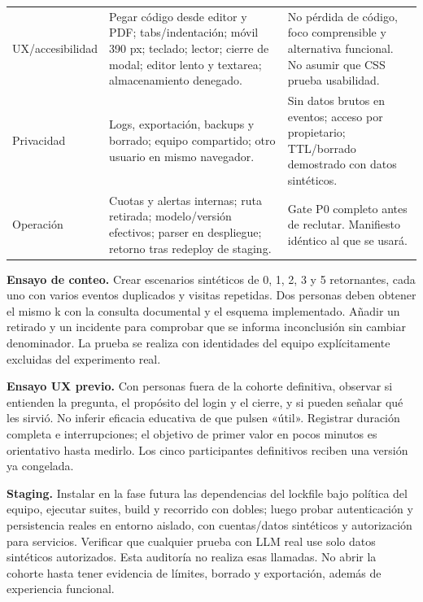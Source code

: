 \documentclass[11pt,a4paper]{report}
\begin{document}
\begin{longtable}{P{2.4cm}P{8cm}P{5.5cm}}
UX/accesibilidad & Pegar código desde editor y PDF; tabs/indentación; móvil 390 px; teclado; lector; cierre de modal; editor lento y textarea; almacenamiento denegado. & No pérdida de código, foco comprensible y alternativa funcional. No asumir que CSS prueba usabilidad.\\
Privacidad & Logs, exportación, backups y borrado; equipo compartido; otro usuario en mismo navegador. & Sin datos brutos en eventos; acceso por propietario; TTL/borrado demostrado con datos sintéticos.\\
Operación & Cuotas y alertas internas; ruta retirada; modelo/versión efectivos; parser en despliegue; retorno tras redeploy de staging. & Gate P0 completo antes de reclutar. Manifiesto idéntico al que se usará.\\\bottomrule
\end{longtable}

\textbf{Ensayo de conteo.} Crear escenarios sintéticos de 0, 1, 2, 3 y 5 retornantes, cada uno con varios eventos duplicados y visitas repetidas. Dos personas deben obtener el mismo k con la consulta documental y el esquema implementado. Añadir un retirado y un incidente para comprobar que se informa inconclusión sin cambiar denominador. La prueba se realiza con identidades del equipo explícitamente excluidas del experimento real.

\textbf{Ensayo UX previo.} Con personas fuera de la cohorte definitiva, observar si entienden la pregunta, el propósito del login y el cierre, y si pueden señalar qué les sirvió. No inferir eficacia educativa de que pulsen «útil». Registrar duración completa e interrupciones; el objetivo de primer valor en pocos minutos es orientativo hasta medirlo. Los cinco participantes definitivos reciben una versión ya congelada.

\textbf{Staging.} Instalar en la fase futura las dependencias del lockfile bajo política del equipo, ejecutar suites, build y recorrido con dobles; luego probar autenticación y persistencia reales en entorno aislado, con cuentas/datos sintéticos y autorización para servicios. Verificar que cualquier prueba con LLM real use solo datos sintéticos autorizados. Esta auditoría no realiza esas llamadas. No abrir la cohorte hasta tener evidencia de límites, borrado y exportación, además de experiencia funcional.
\end{document}
